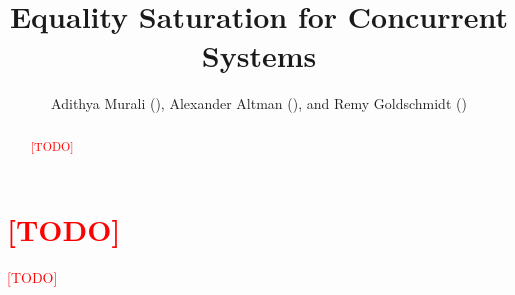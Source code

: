 \documentclass[american,extrafontsizes,12pt,portrait,letterpaper,oneside,onecolumn,article,final,fleqn]{memoir}
\author{Adithya Murali (\email{adithya5@illinois.edu}), Alexander Altman (\email{altman3@illinois.edu}), and Remy Goldschmidt (\email{regolds2@illinois.edu})}
\title{Equality Saturation for Concurrent Systems}
\date{}
\newcommand*\TODO{\textcolor{red}{[TODO]}\xspace}
\begin{document}
\checkandfixthelayout[nearest]
\midsloppy

\maketitle

\begin{abstract}
\TODO
\end{abstract}

\chapter{\TODO}

\TODO
\end{document}
